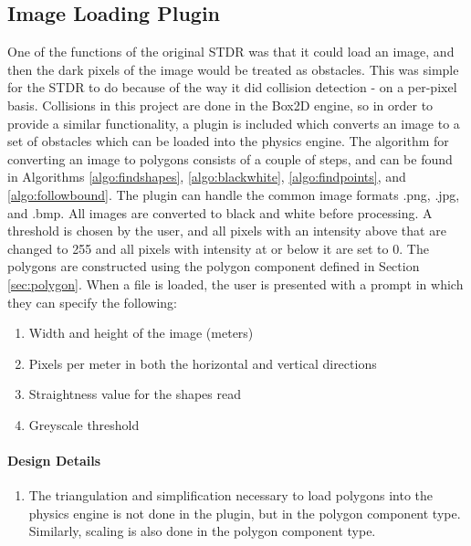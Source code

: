 \begin{itemize}
\subsection{Image Loading Plugin}
One of the functions of the original STDR was that it could load an image, and then the dark pixels of the image would be treated as obstacles. This was simple for the STDR to do because of the way it did collision detection - on a per-pixel basis. Collisions in this project are done in the Box2D engine, so in order to provide a similar functionality, a plugin is included which converts an image to a set of obstacles which can be loaded into the physics engine. The algorithm for converting an image to polygons consists of a couple of steps, and can be found in Algorithms \ref{algo:findshapes}, \ref{algo:blackwhite}, \ref{algo:findpoints}, and \ref{algo:followbound}. The plugin can handle the common image formats .png, .jpg, and .bmp. All images are converted to black and white before processing. A threshold is chosen by the user, and all pixels with an intensity above that are changed to 255 and all pixels with intensity at or below it are set to 0. The polygons are constructed using the polygon component defined in Section \ref{sec:polygon}. When a file is loaded, the user is presented with a prompt in which they can specify the following:
\begin{enumerate}
	\item Width and height of the image (meters)
	\item Pixels per meter in both the horizontal and vertical directions
	\item Straightness value for the shapes read
	\item Greyscale threshold
\end{enumerate}

\paragraph{Design Details}
\begin{enumerate}
\item The triangulation and simplification necessary to load polygons into the physics engine is not done in the plugin, but in the polygon component type. Similarly, scaling is also done in the polygon component type.
\end{enumerate}


\end{itemize}
